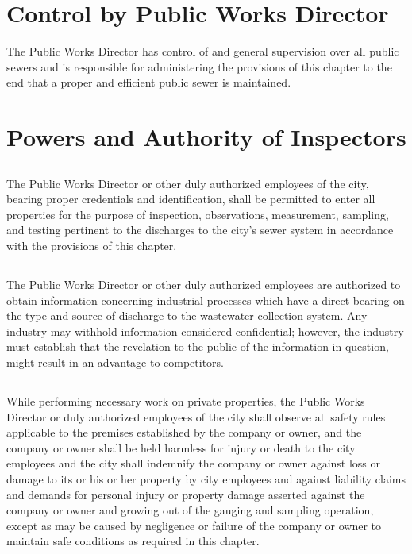 \setcounter{section}{69}
\section{Control by Public Works Director}
The Public Works Director has control of and general supervision over all public sewers and is responsible for administering the provisions of this chapter to the end that a proper and efficient public sewer is maintained.

\section{Powers and Authority of Inspectors}
\subsection{}
The Public Works Director or other duly authorized employees of the city, bearing proper credentials and identification, shall be permitted to enter all properties for the purpose of inspection, observations, measurement, sampling, and testing pertinent to the discharges to the city’s sewer system in accordance with the provisions of this chapter.
\subsection{}
The Public Works Director or other duly authorized employees are authorized to obtain information concerning industrial processes which have a direct bearing on the type and source of discharge to the wastewater collection system.  Any industry may withhold information considered confidential; however, the industry must establish that the revelation to the public of the information in question, might result in an advantage to competitors.
\subsection{}
While performing necessary work on private properties, the Public Works Director or duly authorized employees of the city shall observe all safety rules applicable to the premises established by the company or owner, and the company or owner shall be held harmless for injury or death to the city employees and the city shall indemnify the company or owner against loss or damage to its or his or her property by city employees and against liability claims and demands for personal injury or property damage asserted against the company or owner and growing out of the gauging and sampling operation, except as may be caused by negligence or failure of the company or owner to maintain safe conditions as required in this chapter.
